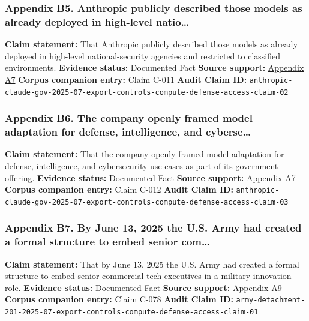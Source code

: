 \documentclass[
  american,
  11pt,
  letterpaper,
]{article}
\begin{document}
\subsubsection{Appendix B5. Anthropic publicly described those models as
already deployed in high-level
natio\ldots{}}\label{appendix-b5-anthropic-publicly-described-those-models-as-already-deployed-in-high-level-natio}

\textbf{Claim statement:} That Anthropic publicly described those models
as already deployed in high-level national-security agencies and
restricted to classified environments. \textbf{Evidence status:}
Documented Fact \textbf{Source support:}
\hyperref[appendix-a7-claude-gov-models-for-u-s-national-security-customers]{Appendix
A7} \textbf{Corpus companion entry:} Claim C-011 \textbf{Audit Claim
ID:}
\texttt{anthropic-claude-gov-2025-07-export-controls-compute-defense-access-claim-02}

\subsubsection{Appendix B6. The company openly framed model adaptation
for defense, intelligence, and
cyberse\ldots{}}\label{appendix-b6-the-company-openly-framed-model-adaptation-for-defense-intelligence-and-cyberse}

\textbf{Claim statement:} That the company openly framed model
adaptation for defense, intelligence, and cybersecurity use cases as
part of its government offering. \textbf{Evidence status:} Documented
Fact \textbf{Source support:}
\hyperref[appendix-a7-claude-gov-models-for-u-s-national-security-customers]{Appendix
A7} \textbf{Corpus companion entry:} Claim C-012 \textbf{Audit Claim
ID:}
\texttt{anthropic-claude-gov-2025-07-export-controls-compute-defense-access-claim-03}

\subsubsection{Appendix B7. By June 13, 2025 the U.S. Army had created a
formal structure to embed senior
com\ldots{}}\label{appendix-b7-by-june-13-2025-the-u-s-army-had-created-a-formal-structure-to-embed-senior-com}

\textbf{Claim statement:} That by June 13, 2025 the U.S. Army had
created a formal structure to embed senior commercial-tech executives in
a military innovation role. \textbf{Evidence status:} Documented Fact
\textbf{Source support:}
\hyperref[appendix-a9-army-launches-detachment-201-executive-innovation-corps-to-drive-tech-transformation]{Appendix
A9} \textbf{Corpus companion entry:} Claim C-078 \textbf{Audit Claim
ID:}
\texttt{army-detachment-201-2025-07-export-controls-compute-defense-access-claim-01}
\end{document}
